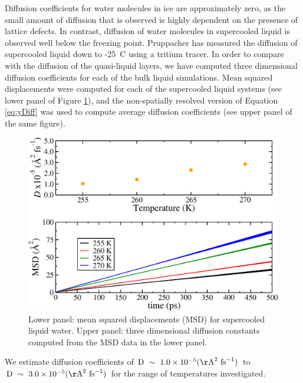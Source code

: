 Diffusion coefficients for water molecules in ice are approximately
zero, as the small amount of diffusion that is observed is highly
dependent on the presence of lattice defects. In contrast, diffusion
of water molecules in supercooled liquid is observed well below the
freezing point.\cite{Debenedetti2003} Pruppacher has measured the
diffusion of supercooled liquid down to -25\degree~C using a tritium
tracer.\cite{Pruppacher1972} In order to compare with the diffusion of
the quasi-liquid layers, we have computed three dimensional diffusion
coefficients for each of the bulk liquid simulations. Mean squared
displacements were computed for each of the supercooled liquid systems
(see lower panel of Figure \ref{fig:bulkD}), and the non-spatially
resolved version of Equation \eqref{eq:yDiff} was used to compute
average diffusion coefficients (see upper panel of the same figure).

\begin{figure}
\includegraphics[width=\linewidth]{Figures/bulkD}
\caption{\label{fig:bulkD} Lower panel: mean squared displacements
  (MSD) for supercooled liquid water. Upper panel: three dimensional
  diffusion constants computed from the MSD data in the lower panel. }
\end{figure}    
 
We estimate diffusion coefficients of
$\mathrm{D}~\sim~ 1.0 \times 10^{-5}
(\mathrm{\AA}^{2}~\mathrm{fs}^{-1})$ to
$\mathrm{D}~\sim~ 3.0 \times 10^{-5}
(\mathrm{\AA}^{2}~\mathrm{fs}^{-1})$ for the range of temperatures
investigated. %

